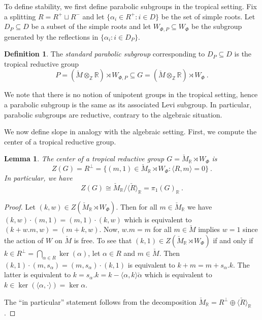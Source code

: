 \documentclass[10pt, a4paper]{amsart}
\newtheorem{lemma}[theorem]{Lemma}
\theoremstyle{definition}
\newtheorem{definition}[theorem]{Definition}
\theoremstyle{myitemstyle}
\newcommand{\R}{\mathbb{R}}
\newcommand{\ZZ}{\mathbb{Z}}
\newcommand{\RR}{\mathbb{R}}
\newcommand{\Mcheck}{{\check{M}}}
\newcommand{\Rcheck}{\check{R}}
\newcommand{\alphacheck}{\check{\alpha}}
\begin{document}
To define stability, we first define parabolic subgroups in the tropical setting. Fix a splitting $R=R^+\sqcup R^-$ and let $\{\alpha_i\in R^+:i\in D\}$ be the set of simple roots. Let $D_P\subseteq D$ be a subset of the simple roots and let $W_{\Phi,P}\subseteq W_{\Phi}$ be the subgroup generated by the reflections in $\{\alpha_i:i\in D_P\}$.

\begin{definition} The \emph{standard parabolic subgroup} corresponding to $D_P\subseteq D$ is the tropical reductive group
\[
P= (\Mcheck\otimes_{\ZZ}\RR) \rtimes W_{\Phi,P} \subseteq G =  (\Mcheck\otimes_{\ZZ}\RR) \rtimes W_{\Phi} \ .
\]
\end{definition}


We note that there is no notion of unipotent groups in the tropical setting, hence a parabolic subgroup is the same as its associated Levi subgroup. In particular, parabolic subgroups are reductive, contrary to the algebraic situation.

We now define slope in analogy with the algebraic setting. First, we compute the center of a tropical reductive group.

\begin{lemma}
\label{lem:center}
The center of a tropical reductive group $G=\Mcheck_{\R}\rtimes W_{\Phi}$ is
\[
Z(G)=R^\perp=\{(m,1)\in \Mcheck_\R\rtimes W_{\Phi} : \langle R,m\rangle=0\} \ .
\]
In particular, we have
\[
Z(G)\cong\Mcheck_{\R}/\langle \Rcheck\rangle_{\RR}=\pi_1(G)_{\RR} \ .
\]
\end{lemma}
\begin{proof}
    Let $(k,w) \in Z(\Mcheck_\R \rtimes W_\Phi)$. Then for all $m \in \Mcheck_\R$ we have $(k,w) \cdot (m,1) = (m,1) \cdot (k,w)$ which is equivalent to $(k+w.m,w) = (m+k,w)$. Now, $w.m = m$ for all $m \in \Mcheck$ implies $w = 1$ since the action of $W$ on $\Mcheck$ is free.
    To see that $(k,1) \in Z(\Mcheck_\R \rtimes W_\Phi)$ if and only if $k \in R^\perp=\bigcap_{\alpha\in R} \ker(\alpha)$, let $\alpha \in R$ and $m \in \Mcheck$. Then $(k,1) \cdot (m,s_\alpha) = (m,s_\alpha) \cdot (k,1)$ is equivalent to $k+m = m + s_\alpha.k$. The latter is equivalent to $k = s_\alpha.k = k - \langle \alpha, k \rangle\alphacheck$ which is equivalent to $k \in \ker(\langle  \alpha, \cdot \rangle) = \ker \alpha$.

    The ``in particular'' statement follows from the decomposition $\Mcheck_\R=R^\perp\oplus\langle \Rcheck\rangle_\R$.
\end{proof}
\end{document}
